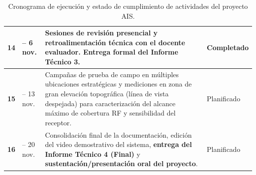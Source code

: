 \documentclass[11pt,a4paper]{article}
\begin{document}
\begin{table}[htbp]
\begin{tabularx}{\textwidth}{>{\centering\arraybackslash}p{1.3cm} >{\centering\arraybackslash}p{2.6cm} >{\raggedright\arraybackslash}X >{\centering\arraybackslash}p{2.2cm}}
\addlinespace[3pt]
\textbf{14} & 2 -- 6 nov. & Sesiones de revisión presencial y retroalimentación técnica con el docente evaluador. \textbf{Entrega formal del Informe Técnico 3}. & Completado \\
\midrule
\textbf{15} & 9 -- 13 nov. & Campañas de prueba de campo en múltiples ubicaciones estratégicas y mediciones en zona de gran elevación topográfica (línea de vista despejada) para caracterización del alcance máximo de cobertura RF y sensibilidad del receptor. & Planificado \\
\addlinespace[3pt]
\textbf{16} & 16 -- 20 nov. & Consolidación final de la documentación, edición del video demostrativo del sistema, \textbf{entrega del Informe Técnico 4 (Final)} y \textbf{sustentación/presentación oral del proyecto}. & Planificado \\
\bottomrule
\end{tabularx}
\caption{Cronograma de ejecución y estado de cumplimiento de actividades del proyecto AIS.}
\label{tab:cronograma_ais}
\end{table}
\end{document}
